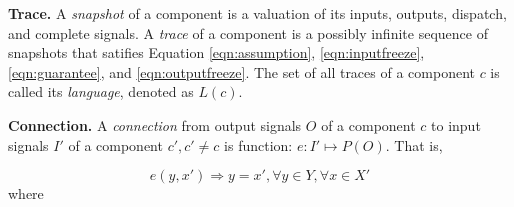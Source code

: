 

{\bf Trace.}
A \emph{snapshot} of a component is a valuation of its inputs, outputs, dispatch, and complete signals. %
A \emph{trace} of a component is a possibly infinite sequence of snapshots %
that satifies Equation \ref{eqn:assumption},  \ref{eqn:inputfreeze}, \ref{eqn:guarantee}, and \ref{eqn:outputfreeze}. %
The set of all traces of a component $c$ is called its \emph{language}, denoted as $L(c)$.

{\bf Connection.}
A \emph{connection} from output signals $O$ of a component $c$ to input signals $I'$ of a component $c', c' \neq c$ is function: $e: I'\mapsto P(O)$. That is,

\begin{equation} 
\label{eqn:connection}
e(y, x') \Rightarrow y = x', \forall y \in Y, \forall x \in X'
\end{equation} 
where 

